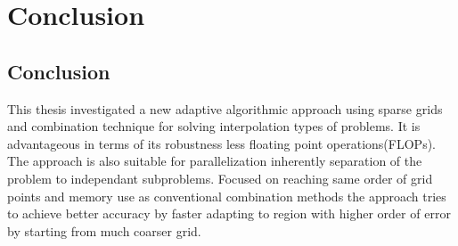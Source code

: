 \chapter{Conclusion}
\label{chapter:results}

\section{Conclusion}
This thesis investigated a new adaptive algorithmic approach using sparse grids and combination technique for solving interpolation types of problems. It is advantageous in terms of its robustness less floating point operations(FLOPs). The approach is also suitable for parallelization inherently separation of the problem to independant subproblems. Focused on reaching same order of grid points and memory use as conventional combination methods the approach tries to achieve better accuracy by faster adapting to region with higher order of error by starting from much coarser grid.\\


